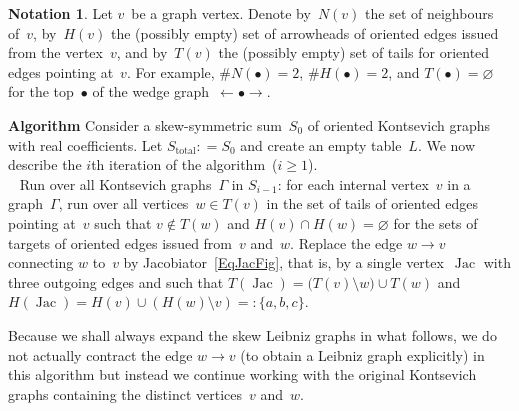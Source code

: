 \documentclass[a4paper]{jpconf}%
\theoremstyle{definition}
\newtheorem*{notation}{Notation}
\theoremstyle{remark}
\DeclareMathOperator{\Jac}{Jac}
\begin{document}
\begin{notation}\label{pNotationNHT}%
Let $v$~be a graph %
vertex. Denote by~$N(v)$ the set of neighbours of~$v$, 
by~$H(v)$ the (possibly %
empty) set of arrowheads 
of oriented edges issued from the vertex~$v$, and
by~$T(v)$ the (possibly %
empty) set of tails %
for oriented edges pointing at~$v$.
For example, $\#N(\bullet)=2$, $\#H(\bullet)=2$, and $T(\bullet)=\varnothing$ 
for the top~$\bullet$ of the wedge graph~${\gets}\bullet{\to}$.
\end{notation}

\smallskip\noindent%
{\textbf{Algorithm}}
Consider a skew\/-\/symmetric sum~$S_0$ of oriented Kontsevich graphs
with real coefficients.
Let $S_{\text{total}} \mathrel{{:}{=}} S_0$ and create an empty table~$L$. %
We now describe the $i$th iteration of the algorithm~($i\geqslant 1$).\\[3pt]
\mbox{ }
Run over all Kontsevich graphs~$\Gamma$ in $S_{i-1}$: for each internal vertex~$v$ 
in a graph~$\Gamma$, run over all vertices~$w\in T(v)$ 
in the set of tails of oriented edges pointing at~$v$
such that $v\notin T(w)$ and $H(v)\cap H(w)=\varnothing$
for the sets of targets of oriented edges issued from~$v$ and~$w$.
Replace the edge $w\to v$ connecting $w$ to~$v$ by %
Jacobiator~\eqref{EqJacFig},
that is, by a single vertex~$\Jac$
with three outgoing edges
and such that $T(\Jac)= \bigl(T(v)\setminus w\bigr)\cup T(w)$ 
and $H(\Jac)=H(v)\cup (H(w)\setminus v) \mathrel{{=}{:}} \{a,b,c\}$.

Because we shall always expand the skew Leibniz graphs in what follows, %
we do not actually contract the edge $w\to v$ (to obtain a %
Leibniz graph explicitly) in this algorithm
but instead we continue working with the original Kontsevich graphs containing the distinct vertices~$v$ and~$w$.
\end{document}
